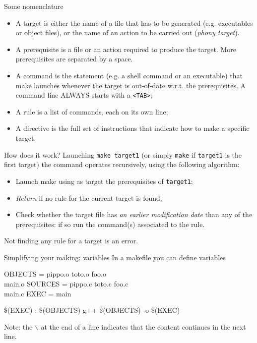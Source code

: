 \documentclass[10pt,aspectratio=169]{beamer}
\begin{document}
\begin{frame}{Some nomenclature}
\begin{itemize}
\item A \alert{target} is either the name of a file that has to be generated
  (e.g. executables or object files), or the name of an \alert{action} to be carried out (\emph{phony target}).
\item A \alert{prerequisite} is a file or an action required to
  produce the target. More prerequisites are separated by a space.
 \item A \alert{command} is the statement (e.g. a shell command or an executable)
 that make launches whenever the target is out-of-date w.r.t. the prerequisites. A
 command line ALWAYS starts with a \texttt{<TAB>};
\item A \alert{rule} is a list of commands, each on its own line;
\item A \alert{directive} is the full set of instructions that
  indicate how to make a specific target.
\end{itemize}
\end{frame}


\begin{frame}{How does it work?}
Launching \texttt{make target1} (or simply \texttt{make} if
\texttt{target1} is the first target) the command operates
\alert{recursively}, using the following algorithm:
\begin{itemize}
\item Launch make using as target the prerequisites of \texttt{target1};
\item \emph{Return} if no rule for the current target is found;
\item Check whether the target file has \emph{an earlier
    modification date} than any of the prerequisites: if so \alert{run
    the command(s) associated to the rule}.
\end{itemize}

Not finding any rule for a target is an error.
\end{frame}


\begin{frame}{Simplifying your making: variables}
In a makefile you can define variables

\begin{semiverbatim}
OBJECTS = pippo.o toto.o foo.o \\ \newline
          main.o\newline
SOURCES = pippo.c toto.c foo.c \\ \newline
          main.c\newline
EXEC    = main\newline

\$(EXEC) : \$(OBJECTS)\newline
\phantom{xx} g++ \$(OBJECTS) -o \$(EXEC)\newline
\end{semiverbatim}
\medskip

Note: the $\backslash$ at the end of a line indicates that the content continues in the next line.
\end{frame}
\end{document}
